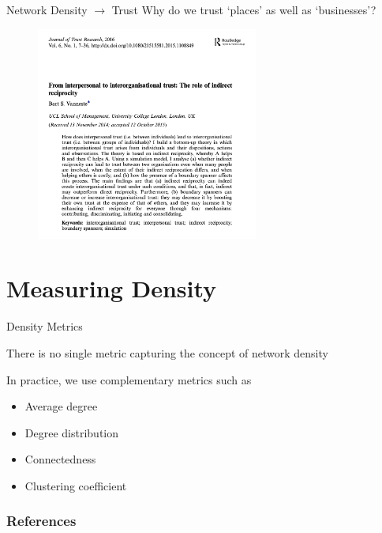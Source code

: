 \documentclass[notes, aspectratio=1610]{beamer}
\begin{document}
\begin{frame}
	{Network Density $\rightarrow$ Trust}
	{Why do we trust `places' as well as `businesses'?}
        \begin{figure}
        	\begin{center}
        		\includegraphics[width=0.65\textwidth]{images/trust_research.png}
        	\end{center}
        \end{figure}
\end{frame}

\section{Measuring Density}

\begin{frame}{Density Metrics}
	\begin{tcolorbox}[
		colback=comp_c!5!white,
		colframe=comp_c!90!black,
		title={\centering !! Pay attention !!}]
		There is no single metric capturing the concept of network density
	\end{tcolorbox}

	\vspace{2em}

	In practice, we use complementary metrics such as 

	\begin{itemize}
		\item Average degree 
		\item Degree distribution 
		\item Connectedness
		\item Clustering coefficient
	\end{itemize}
\end{frame}

\begin{frame}
	\frametitle{References}
	\printbibliography
 \end{frame} 

\end{document}

